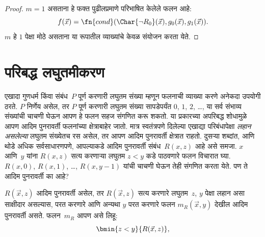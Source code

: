\begin{proof}
  $m = 1$ असताना हे फक्त पुढीलप्रमाणे परिभाषित केलेले फलन आहे:
  \[  f(\vec x) = \fn{cond}(\Char{\lnot R_0}(\vec x),g_0(\vec x),g_1(\vec
  x)).
  \]
  $m$ हे $1$ पेक्षा मोठे असताना या रूपातील व्याख्यांचे केवळ संयोजन करता
  येते.
\end{proof}










\section{परिबद्ध लघुतमीकरण}\label{cmp:rec:bmi:sec}

\begin{explain}
एखादा गुणधर्म किंवा संबंध~$P$ पूर्ण करणारी लघुतम संख्या म्हणून फलनाची
व्याख्या करणे अनेकदा उपयोगी ठरते. $P$ निर्णेय असेल, तर $P$ पूर्ण करणारी
लघुतम संख्या सापडेपर्यंत $0$, $1$, $2$, \dots, या सर्व संभाव्य संख्यांची
चाचणी घेऊन आपण हे फलन सहज संगणित करू शकतो. या प्रकारच्या अपरिबद्ध
शोधामुळे आपण आदिम पुनरावर्ती फलनांच्या क्षेत्राबाहेर जातो. मात्र स्वतंत्रपणे
दिलेल्या एखाद्या परिबंधापेक्षा \emph{लहान असलेल्या} लघुतम संख्येतच रस
असेल, तर आपण आदिम पुनरावर्ती क्षेत्रात राहतो. दुसऱ्या शब्दांत, आणि थोडे
अधिक सर्वसाधारणपणे, आपल्याकडे आदिम पुनरावर्ती संबंध~$R(x,z)$ आहे असे
समजा. $x$ आणि~$y$ यांना $R(x, z)$ सत्य करणाऱ्या लघुतम $z < y$ कडे
पाठवणारे फलन विचारात घ्या. $R(x, 0)$, $R(x, 1)$, \dots,
$R(x, y-1)$ यांची चाचणी घेऊन तेही संगणित करता येते. पण ते आदिम
पुनरावर्ती का आहे?
\end{explain}

\begin{prop}
$R(\vec x, z)$ आदिम पुनरावर्ती असेल, तर $R(\vec x, z)$ सत्य करणारे
लघुतम~$z$, $y$ पेक्षा लहान असा साक्षीदार असल्यास, परत करणारे आणि अन्यथा
$y$ परत करणारे फलन $m_R(\vec{x}, y)$ देखील आदिम पुनरावर्ती असते.
फलन~$m_R$ आपण असे लिहू:
\[\bmin{z < y}{R(\vec{x}, z)},
\]
\end{prop}

